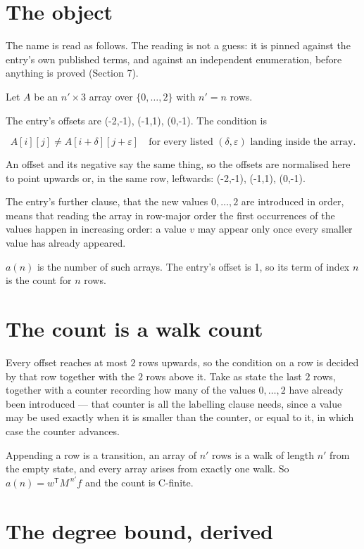 \documentclass[11pt]{article}
\theoremstyle{definition}
\begin{document}
\section{The object}

The name is read as follows. The reading is not a guess: it is pinned against the entry's own published terms, and against an independent enumeration, before anything is proved (Section 7).

Let $A$ be an $n' \times 3$ array over $\{0,\dots,2\}$ with $n' = n$ rows.

The entry's offsets are (-2,-1), (-1,1), (0,-1). The condition is

\[A[i][j] \ne A[i{+}\delta][j{+}\varepsilon]\quad\text{for every listed }(\delta,\varepsilon)\text{ landing inside the array.}\]

An offset and its negative say the same thing, so the offsets are normalised here to point upwards or, in the same row, leftwards: (-2,-1), (-1,1), (0,-1).

The entry's further clause, that the new values $0,\dots,2$ are introduced in order, means that reading the array in row-major order the first occurrences of the values happen in increasing order: a value $v$ may appear only once every smaller value has already appeared.

$a(n)$ is the number of such arrays. The entry's offset is 1, so its term of index $n$ is the count for $n$ rows.

\section{The count is a walk count}

Every offset reaches at most $2$ rows upwards, so the condition on a row is decided by that row together with the $2$ rows above it. Take as state the last $2$ rows, together with a counter recording how many of the values $0,\dots,2$ have already been introduced --- that counter is all the labelling clause needs, since a value may be used exactly when it is smaller than the counter, or equal to it, in which case the counter advances.

Appending a row is a transition, an array of $n'$ rows is a walk of length $n'$ from the empty state, and every array arises from exactly one walk. So $a(n) = w^{\mathsf T}M^{\,n'}f$ and the count is C-finite.

\section{The degree bound, derived}
\end{document}
